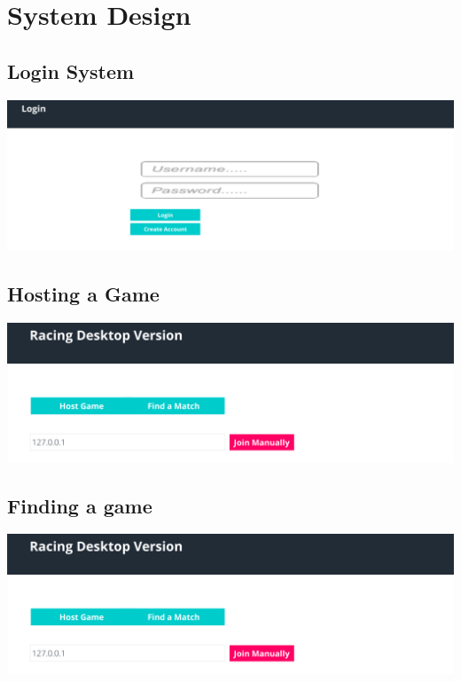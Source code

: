 
\chapter{System Design}

\section{Login System}

\includegraphics[width=1\columnwidth]{img/LoginActual.PNG}

\section{Hosting a Game}

\includegraphics[width=1\columnwidth]{img/MatchFinder1Actual.PNG}

\section{Finding a game}

\includegraphics[width=1\columnwidth]{img/MatchFinder1Actual.PNG}

